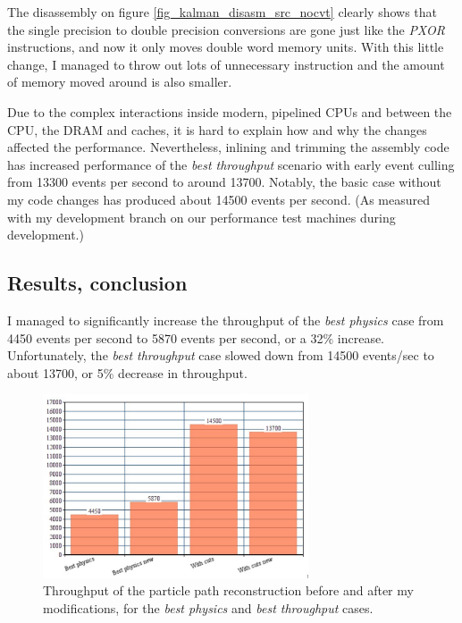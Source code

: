 \documentclass[12pt]{article}
\begin{document}
The disassembly on figure \ref{fig_kalman_disasm_src_nocvt} clearly shows that the single precision to double precision conversions are gone just like the \textit{PXOR} instructions, and now it only moves double word memory units. With this little change, I managed to throw out lots of unnecessary instruction and the amount of memory moved around is also smaller.

Due to the complex interactions inside modern, pipelined CPUs and between the CPU, the DRAM and caches, it is hard to explain how and why the changes affected the performance. Nevertheless, inlining and trimming the assembly code has increased performance of the \textit{best throughput} scenario with early event culling from 13300 events per second to around 13700. Notably, the basic case without my code changes has produced about 14500 events per second. \small (As measured with my development branch on our performance test machines during development.) \normalsize


\subsection{Results, conclusion}

I managed to significantly increase the throughput of the \textit{best physics} case from 4450 events per second to 5870 events per second, or a 32\% increase. Unfortunately, the \textit{best throughput} case slowed down from 14500 events/sec to about 13700, or 5\% decrease in throughput.

\begin{figure}[H]
	\begin{center}
		\includegraphics[width=0.7\textwidth]{kalmanfit_throughput_results_lowquality}
	\end{center}
	\caption{Throughput of the particle path reconstruction before and after my modifications, for the \textit{best physics} and \textit{best throughput} cases.}
	\label{fig_kalmanfit_results_throughput}
\end{figure}
\end{document}
